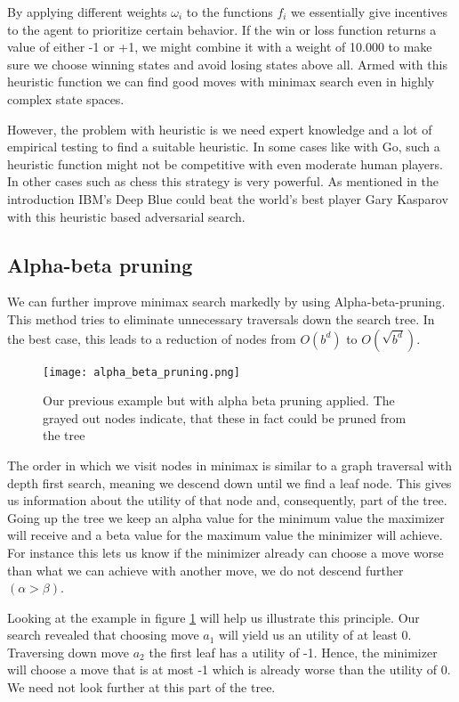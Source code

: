 By applying different weights $ \omega_i $ to the functions $ f_i $ we essentially give incentives to the agent to prioritize certain behavior. If the win or loss function returns a value of either -1 or +1, we might combine it with a weight of 10.000 to make sure we choose winning states and avoid losing states above all. Armed with this heuristic function we can find good moves with minimax search even in highly complex state spaces.

However, the problem with heuristic is we need expert knowledge and a lot of empirical testing to find a suitable heuristic. In some cases like with Go, such a heuristic function might not be competitive with even moderate human players. In other cases such as chess this strategy is very powerful. As mentioned in the introduction IBM's Deep Blue could beat the world's best player Gary Kasparov with this heuristic based adversarial search.

\subsection{Alpha-beta pruning}
We can further improve minimax search markedly by using Alpha-beta-pruning. This method tries to eliminate unnecessary traversals down the search tree. In the best case, this leads to a reduction of nodes from $ O(b^d) $ to $ O(\sqrt{b^d}) $.

\begin{figure}
    \centering
    \texttt{[image: alpha\_beta\_pruning.png]}
    \caption{Our previous example but with alpha beta pruning applied. The grayed out nodes indicate, that these in fact could be pruned from the tree}
    \label{alpha_beta_pruning}
\end{figure}

The order in which we visit nodes in minimax is similar to a graph traversal with depth first search, meaning we descend down until we find a leaf node. This gives us information about the utility of that node and, consequently, part of the tree. Going up the tree we keep an alpha value for the minimum value the maximizer will receive and a beta value for the maximum value the minimizer will achieve. For instance this lets us know if the minimizer already can choose a move worse than what we can achieve with another move, we do not descend further $ (\alpha > \beta) $.

Looking at the example in figure \ref{alpha_beta_pruning} will help us illustrate this principle. Our search revealed that choosing move $ a_1 $ will yield us an utility of at least 0. Traversing down move $ a_2 $ the first leaf has a utility of -1. Hence, the minimizer will choose a move that is at most -1 which is already worse than the utility of 0. We need not look further at this part of the tree.

